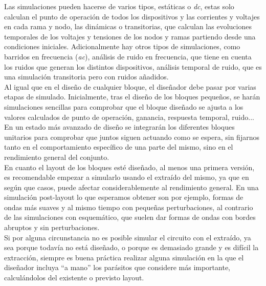 Las simulaciones pueden hacerse de varios tipos, estáticas o \textit{dc}, estas
solo calculan el punto de operación de todos los dispositivos y las corrientes y
voltajes en cada rama y nodo, las dinámicas o transitorias, que calculan las
evoluciones temporales de los voltajes y tensiones de los nodos y ramas partiendo
desde una condiciones iniciales. Adicionalmente hay otros tipos de simulaciones,
como barridos en frecuencia (\textit{ac}), análisis de ruido en frecuencia, que
tiene en cuenta los ruidos que generan los distintos dispositivos, análisis temporal
de ruido, que es una simulación transitoria pero con ruidos añadidos.\\

Al igual que en el diseño de cualquier bloque, el diseñador debe pasar por varias
etapas de simulado. Inicialmente, tras el diseño de los bloques pequeños, se harán
simulaciones sencillas para comprobar que el bloque diseñado se ajusta a los valores
calculados de punto de operación, ganancia, respuesta temporal, ruido...\\

En un estado más avanzado de diseño se integrarán los diferentes bloques unitarios
para comprobar que juntos siguen actuando como se espera, sin fijarnos tanto en el
comportamiento específico de una parte del mismo, sino en el rendimiento general del
conjunto.\\

En cuanto el layout de los bloques esté diseñado, al menos una primera versión, es
recomendable empezar a simularlo usando el extraído del mismo, ya que en según que
casos, puede afectar considerablemente al rendimiento general. En una simulación
post-layout lo que esperamos obtener son por ejemplo, formas de ondas más suaves
y al mismo tiempo con pequeñas perturbaciones, al contrario de las simulaciones
con esquemático, que suelen dar formas de ondas con bordes abruptos y sin perturbaciones.\\

Si por alguna circunstancia no es posible simular el circuito con el extraído, ya
sea porque todavía no está diseñado, o porque es demasiado grande y es difícil
la extracción, siempre es buena práctica realizar alguna simulación en la que el
diseñador incluya ``a mano'' los parásitos que considere más importante,
calculándolos del existente o previsto layout.\\


